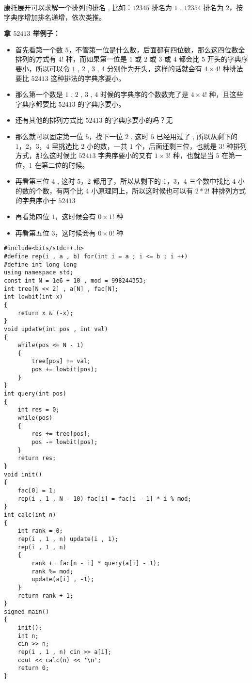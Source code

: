 \documentclass[E:/GsjzTle/main/main.tex]{subfiles}
\begin{document}
康托展开可以求解一个排列的排名 , 比如：\(12345\) 排名为 \(1\) ,
\(12354\) 排名为 \(2\)，按字典序增加排名递增，依次类推。

\textbf{拿 \(52413\) 举例子：}

\begin{itemize}
\item
  首先看第一个数
  \(5\)，不管第一位是什么数，后面都有四位数，那么这四位数全排列的方式有
  \(4!\) 种，而如果第一位是 \(1\) 或 \(2\) 或 \(3\) 或 \(4\) 都会比
  \(5\) 开头的字典序要小，所以可以令 \(1\) , \(2\) , \(3\) , \(4\)
  分别作为开头，这样的话就会有 \(4 × 4!\) 种排法要比 \(52413\)
  这种排法的字典序要小。
\item
  那么第一个数是 \(1\) , \(2\) , \(3\) , \(4\)
  时候的字典序的个数数完了是 \(4 × 4!\) 种，且这些字典序都要比 \(52413\)
  的字典序要小。
\item
  还有其他的排列方式比 \(52413\) 的字典序要小的吗？无
\item
  那么就可以固定第一位 \(5\)，找下一位 \(2\) , 这时 \(5\) 已经用过了 ,
  所以从剩下的 \(1，2，3，4\) 里挑选比 \(2\) 小的数，一共 \(1\)
  个，后面还剩三位，也就是 \(3!\) 种排列方式，那么这时候比 \(52413\)
  字典序要小的又有 \(1 × 3!\) 种，也就是当 \(5\) 在第一位，\(1\)
  在第二位的时候。
\item
  再看第三位 \(4\) , 这时 \(5，2\) 都用了，所以从剩下的 \(1，3，4\)
  三个数中找比 \(4\) 小的数的个数，有两个比 \(4\)
  小原理同上，所以这时候也可以有 \(2 * 2!\) 种排列方式的字典序小于
  \(52413\)
\item
  再看第四位 \(1\)，这时候会有 \(0 × 1!\) 种
\item
  再看第五位 \(3\)，这时候会有 \(0 × 0!\) 种
\end{itemize}

\begin{lstlisting}
#include<bits/stdc++.h>
#define rep(i , a , b) for(int i = a ; i <= b ; i ++)
#define int long long
using namespace std;
const int N = 1e6 + 10 , mod = 998244353;
int tree[N << 2] , a[N] , fac[N];
int lowbit(int x)
{
	return x & (-x);
}
void update(int pos , int val)
{
	while(pos <= N - 1)
	{
		tree[pos] += val;
		pos += lowbit(pos);
	}
}
int query(int pos)
{
	int res = 0;
	while(pos)
	{
		res += tree[pos];
		pos -= lowbit(pos);
	}
	return res;
}
void init()
{
	fac[0] = 1;
	rep(i , 1 , N - 10) fac[i] = fac[i - 1] * i % mod;
}
int calc(int n)
{
	int rank = 0;
	rep(i , 1 , n) update(i , 1);
	rep(i , 1 , n)
	{
		rank += fac[n - i] * query(a[i] - 1);
		rank %= mod;
		update(a[i] , -1);
	}
	return rank + 1;
}
signed main()
{
	init();
	int n;
	cin >> n;
	rep(i , 1 , n) cin >> a[i];
	cout << calc(n) << '\n';
	return 0;
}
\end{lstlisting}
\end{document}
